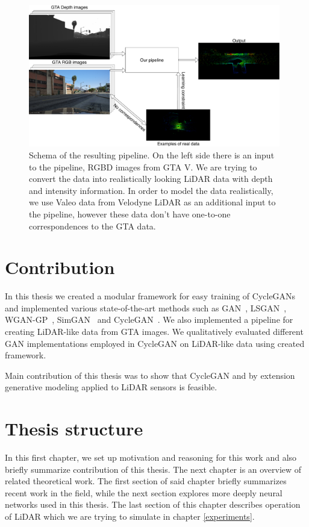 \begin{figure}
\centering
\includegraphics[keepaspectratio, width=0.98\textwidth]{img/algorithm.pdf}
\caption[Schema of the resulting pipeline]{Schema of the resulting pipeline. On the left side there is an input to the pipeline, RGBD images from GTA V. We are trying to convert the data into realistically looking LiDAR data with depth and intensity information. In order to model the data realistically, we use Valeo data from Velodyne LiDAR as an additional input to the pipeline, however these data don't have one-to-one correspondences to the GTA data.}
\label{schema}
\end{figure}

\section{Contribution}
In this thesis we created a modular framework for easy training of CycleGANs and implemented various state-of-the-art methods such as GAN~\cite{origgan}, LSGAN~\cite{lsgan}, WGAN-GP~\cite{wgan-gp}, SimGAN~\cite{historypool} and CycleGAN~\cite{cyclegan}. We also implemented a pipeline for creating LiDAR-like data from GTA images. We qualitatively evaluated different GAN implementations employed in CycleGAN on LiDAR-like data using created framework.

Main contribution of this thesis was to show that CycleGAN and by extension generative modeling applied to LiDAR sensors is feasible.

\section{Thesis structure}
In this first chapter, we set up motivation and reasoning for this work and also briefly summarize contribution of this thesis. The next chapter is an overview of related theoretical work. The first section of said chapter briefly summarizes recent work in the field, while the next section explores more deeply neural networks used in this thesis. The last section of this chapter describes operation of LiDAR which we are trying to simulate in chapter \ref{experiments}.

